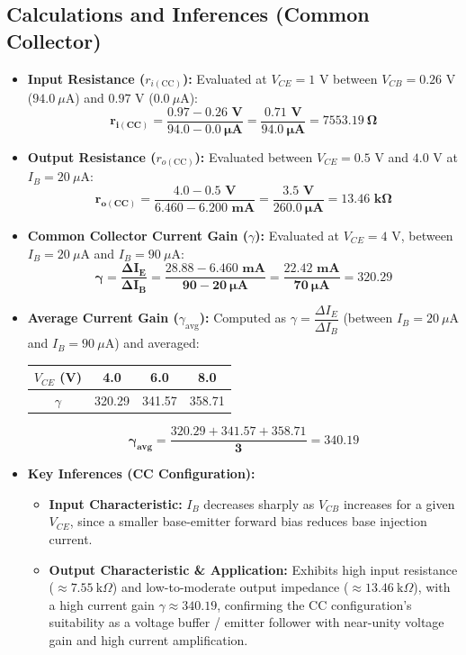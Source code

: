 \documentclass[11pt,a4paper]{article}
\begin{document}
\subsection{Calculations and Inferences (Common Collector)}
\begin{itemize}
    \item \textbf{Input Resistance ($r_{i(\text{CC})}$):} Evaluated at $V_{CE} = 1\text{ V}$ between $V_{CB} = 0.26\text{ V}$ ($94.0\ \mu\text{A}$) and $0.97\text{ V}$ ($0.0\ \mu\text{A}$):
    \[
    \mathbf{r_{i(\text{CC})} = \frac{0.97 - 0.26\text{ V}}{94.0 - 0.0\ \mu\text{A}} = \frac{0.71\text{ V}}{94.0\ \mu\text{A}} = 7553.19\ \Omega}
    \]
    \item \textbf{Output Resistance ($r_{o(\text{CC})}$):} Evaluated between $V_{CE} = 0.5\text{ V}$ and $4.0\text{ V}$ at $I_B = 20\ \mu\text{A}$:
    \[
    \mathbf{r_{o(\text{CC})} = \frac{4.0 - 0.5\text{ V}}{6.460 - 6.200\text{ mA}} = \frac{3.5\text{ V}}{260.0\ \mu\text{A}} = 13.46\text{ k}\Omega}
    \]
    \item \textbf{Common Collector Current Gain ($\gamma$):} Evaluated at $V_{CE} = 4\text{ V}$, between $I_B = 20\ \mu\text{A}$ and $I_B = 90\ \mu\text{A}$:
    \[
    \mathbf{\gamma = \frac{\Delta I_E}{\Delta I_B} = \frac{28.88 - 6.460\text{ mA}}{90 - 20\ \mu\text{A}} = \frac{22.42\text{ mA}}{70\ \mu\text{A}} = 320.29}
    \]
    \item \textbf{Average Current Gain ($\gamma_{\text{avg}}$):} Computed as $\gamma = \dfrac{\Delta I_E}{\Delta I_B}$ (between $I_B=20\ \mu\text{A}$ and $I_B=90\ \mu\text{A}$) and averaged:
    \begin{center}
    \begin{tabular}{c c c c}
    \toprule
    $V_{CE}$ (V) & 4.0 & 6.0 & 8.0 \\
    \midrule
    $\gamma$ & 320.29 & 341.57 & 358.71 \\
    \bottomrule
    \end{tabular}
    \end{center}
    \[
    \mathbf{\gamma_{\text{avg}} = \frac{320.29+341.57+358.71}{3} = 340.19}
    \]
    \item \textbf{Key Inferences (CC Configuration):}
    \begin{itemize}
        \item \textbf{Input Characteristic:} $I_B$ decreases sharply as $V_{CB}$ increases for a given $V_{CE}$, since a smaller base-emitter forward bias reduces base injection current.
        \item \textbf{Output Characteristic \& Application:} Exhibits high input resistance ($\approx 7.55\ \text{k}\Omega$) and low-to-moderate output impedance ($\approx 13.46\ \text{k}\Omega$), with a high current gain $\gamma \approx 340.19$, confirming the CC configuration's suitability as a voltage buffer / emitter follower with near-unity voltage gain and high current amplification.
    \end{itemize}
\end{itemize}
\clearpage
\end{document}
